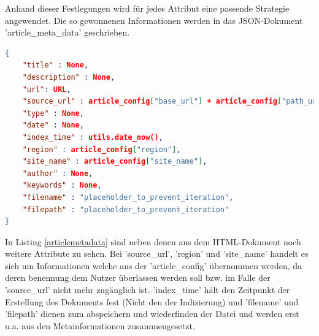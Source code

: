 \documentclass[12pt,oneside,a4paper,parskip]{scrbook}
\begin{document}
Anhand dieser Festlegungen wird für jedes Attribut eine passende Strategie angewendet. Die so gewonnenen Informationen werden in das JSON-Dokument 'article\_meta\_data' geschrieben.
\begin{lstlisting}[caption=article\_meta\_data Dokument vor seiner Befüllung mit Daten,label=articlemetadata,language=json]
{
	"title" : None,
	"description" : None,
	"url": URL,
	"source_url" : article_config["base_url"] + article_config["path_url"],
	"type" : None,
	"date" : None,
	"index_time" : utils.date_now(),
	"region" : article_config["region"],
	"site_name" : article_config["site_name"],
	"author" : None,
	"keywords" : None,
	"filename" : "placeholder_to_prevent_iteration",
	"filepath" : "placeholder_to_prevent_iteration"
}
\end{lstlisting}
In Listing \ref{articlemetadata} sind neben denen aus dem HTML-Dokument noch weitere Attribute zu sehen. Bei 'source\_url', 'region' und 'site\_name' handelt es sich um Informationen welche aus der 'article\_config' übernommen werden, da deren benennung dem Nutzer überlassen werden soll bzw. im Falle der 'source\_url' nicht mehr zugänglich ist. 'index\_time' hält den Zeitpunkt der Erstellung des Dokuments fest (Nicht den der Indizierung) und 'filename' und 'filepath' dienen zum abspeichern und wiederfinden der Datei und werden erst u.a. aus den Metainformationen zusammengesetzt.

\pagebreak
\end{document}
